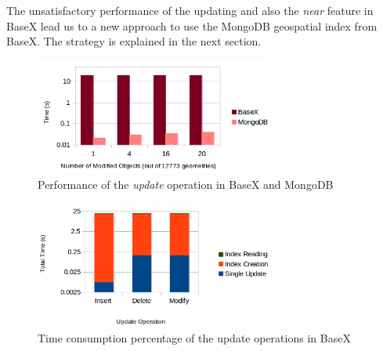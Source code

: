 \documentclass[a4paper,12pt]{article}
\begin{document}
The unsatisfactory performance of the updating and also the \textit{near} feature in BaseX lead us to a new approach to use the MongoDB geospatial index from BaseX. The strategy is explained in the next section.

 


\begin{figure}
\centering
\includegraphics[width=0.7\textwidth]{BXvsMongo-Update-sec.png}
\caption{Performance of the \textit{update} operation in BaseX and MongoDB}
\label{figBXvsMongoUpdate}
\end{figure}


\begin{figure}
\centering
\includegraphics[width=0.7\textwidth]{BXUpdate.png}
\caption{Time consumption percentage of the update operations in BaseX}
\label{figBXUpdate}
\end{figure}
\end{document}
